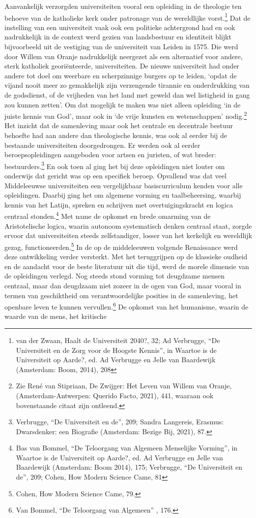 \documentclass{jote-book}
\begin{document}
	Aanvankelijk verzorgden universiteiten vooral een opleiding in de theologie ten behoeve van de katholieke kerk onder patronage van de wereldlijke vorst.\footnote{van der Zwaan, Haalt de Universiteit 2040?, 32; Ad Verbrugge, “De Universiteit en de Zorg voor de Hoogste Kennis”, in Waartoe is de Universiteit op Aarde?, ed. Ad Verbrugge en Jelle van Baardewijk (Amsterdam: Boom, 2014), 208} Dat de instelling van een universiteit vaak ook een politieke achtergrond had en ook nadrukkelijk in de context werd gezien van landsbestuur en identiteit blijkt bijvoorbeeld uit de vestiging van de universiteit van Leiden in 1575. Die werd door Willem van Oranje nadrukkelijk neergezet als een alternatief voor andere, sterk katholiek georiënteerde, universiteiten. De nieuwe universiteit had onder andere tot doel om weerbare en scherpzinnige burgers op te leiden, ‘opdat de vijand nooit meer zo gemakkelijk zijn verzengende tirannie en onderdrukking van de godsdienst, of de vrijheden van het land met geweld dan wel listigheid in gang zou kunnen zetten'. Om dat mogelijk te maken was niet alleen opleiding ‘in de juiste kennis van God', maar ook in ‘de vrije kunsten en wetenschappen' nodig.\footnote{Zie René van Stipriaan, De Zwijger: Het Leven van Willem van Oranje, (Amsterdam-Antwerpen: Querido Facto, 2021), 441, waaraan ook bovenstaande citaat zijn ontleend.} Het inzicht dat de samenleving maar ook het centrale en decentrale bestuur behoefte had aan andere dan theologische kennis, was ook al eerder bij de bestaande universiteiten doorgedrongen. Er werden ook al eerder beroepsopleidingen aangeboden voor artsen en juristen, of wat breder: bestuurders.\footnote{Verbrugge, “De Universiteit en de”, 209; Sandra Langereis, Erasmus: Dwarsdenker: een Biografie (Amsterdam: Bezige Bij, 2021), 87.} En ook toen al ging het bij deze opleidingen niet louter om onderwijs dat gericht was op een specifiek beroep. Opvallend was dat veel Middeleeuwse universiteiten een vergelijkbaar basiscurriculum kenden voor alle opleidingen. Daarbij ging het om algemene vorming en taalbeheersing, waarbij kennis van het Latijn, spreken en schrijven met overtuigingskracht en logica centraal stonden.\footnote{Bas van Bommel, “De Teloorgang van Algemeen Menselijke Vorming”, in Waartoe is de Universiteit op Aarde?, ed. Ad Verbrugge en Jelle van Baardewijk (Amsterdam: Boom 2014), 175; Verbrugge, “De Universiteit en de”, 209; Cohen, How Modern Science Came, 81} Met name de opkomst en brede omarming van de Aristotelische logica, waarin autonoom systematisch denken centraal staat, zorgde ervoor dat universiteiten steeds zelfstandiger, losser van het kerkelijk en wereldlijk gezag, functioneerden.\footnote{Cohen, How Modern Science Came, 79.} In de op de middeleeuwen volgende Renaissance werd deze ontwikkeling verder versterkt. Met het teruggrijpen op de klassieke oudheid en de aandacht voor de beste literatuur uit die tijd, werd de morele dimensie van de opleidingen verlegd. Nog steeds stond vorming tot deugdzame mensen centraal, maar dan deugdzaam niet zozeer in de ogen van God, maar vooral in termen van geschiktheid om verantwoordelijke posities in de samenleving, het openbare leven te kunnen vervullen.\footnote{Van Bommel, “De Teloorgang van Algemeen” , 176.} De opkomst van het humanisme, waarin de waarde van de mens, het kritische 
\end{document}
